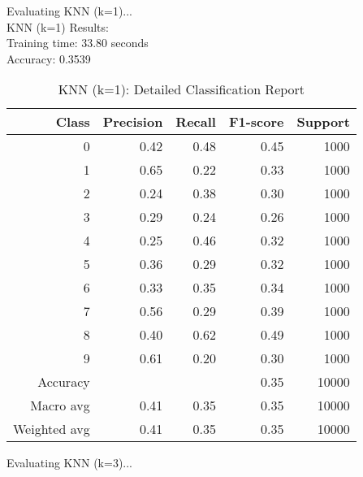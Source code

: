 Evaluating KNN (k=1)...\\

KNN (k=1) Results:\\
Training time: 33.80 seconds\\
Accuracy: 0.3539
\begin{table}[H]
  \centering
  \begin{tabular}{r r r r r}
    \toprule
    Class & Precision & Recall & F1-score & Support \\
    \midrule
    0 & 0.42 & 0.48 & 0.45 & 1000 \\
    1 & 0.65 & 0.22 & 0.33 & 1000 \\
    2 & 0.24 & 0.38 & 0.30 & 1000 \\
    3 & 0.29 & 0.24 & 0.26 & 1000 \\
    4 & 0.25 & 0.46 & 0.32 & 1000 \\
    5 & 0.36 & 0.29 & 0.32 & 1000 \\
    6 & 0.33 & 0.35 & 0.34 & 1000 \\
    7 & 0.56 & 0.29 & 0.39 & 1000 \\
    8 & 0.40 & 0.62 & 0.49 & 1000 \\
    9 & 0.61 & 0.20 & 0.30 & 1000 \\
    \midrule
    Accuracy & & & 0.35 & 10000 \\
    Macro avg & 0.41 & 0.35 & 0.35 & 10000 \\
    Weighted avg & 0.41 & 0.35 & 0.35 & 10000 \\
    \bottomrule
  \end{tabular}
  \vspace{10pt}
  \caption{KNN (k=1): Detailed Classification Report}
\end{table}

Evaluating KNN (k=3)...\\

